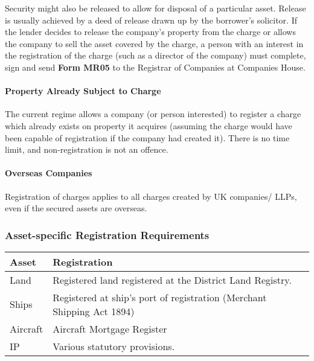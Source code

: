 \documentclass[
]{article}
\begin{document}
Security might also be released to allow for disposal of a particular
asset. Release is usually achieved by a deed of release drawn up by the
borrower's solicitor. If the lender decides to release the company's
property from the charge or allows the company to sell the asset covered
by the charge, a person with an interest in the registration of the
charge (such as a director of the company) must complete, sign and send
\textbf{Form MR05} to the Registrar of Companies at Companies House.

\hypertarget{property-already-subject-to-charge}{%
\paragraph{Property Already Subject to
Charge}\label{property-already-subject-to-charge}}

The current regime allows a company (or person interested) to register a
charge which already exists on property it acquires (assuming the charge
would have been capable of registration if the company had created it).
There is no time limit, and non-registration is not an offence.

\hypertarget{overseas-companies}{%
\paragraph{Overseas Companies}\label{overseas-companies}}

Registration of charges applies to all charges created by UK companies/
LLPs, even if the secured assets are overseas.

\hypertarget{asset-specific-registration-requirements}{%
\subsubsection{Asset-specific Registration
Requirements}\label{asset-specific-registration-requirements}}

\begin{longtable}[]{@{}ll@{}}
\toprule()
Asset & Registration \\
\midrule()
\endhead
Land & Registered land registered at the District Land Registry. \\
Ships & Registered at ship's port of registration (Merchant Shipping Act
1894) \\
Aircraft & Aircraft Mortgage Register \\
IP & Various statutory provisions. \\
\bottomrule()
\end{longtable}
\end{document}
